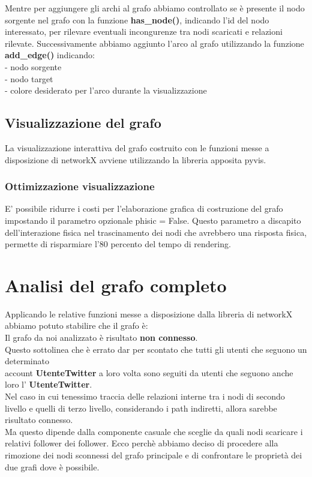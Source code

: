 \documentclass[a4paper,11pt]{report}
\begin{document}
Mentre per aggiungere gli archi al grafo abbiamo controllato se è presente il nodo sorgente nel grafo con la funzione \textbf{has\_node()}, indicando l'id del nodo interessato, per rilevare eventuali incongurenze tra nodi scaricati e relazioni rilevate. Successivamente abbiamo aggiunto l'arco al grafo utilizzando la funzione \textbf{add\_edge()} indicando:\\
- nodo sorgente\\
- nodo target \\
- colore desiderato per l'arco durante la visualizzazione\\

\subsection{Visualizzazione del grafo}
La visualizzazione interattiva del grafo costruito con le funzioni messe a disposizione di networkX avviene utilizzando la libreria apposita pyvis. 
\subsubsection{Ottimizzazione visualizzazione}
E' possibile ridurre i costi per l'elaborazione grafica di costruzione del grafo impostando il parametro opzionale phisic = False. Questo parametro a discapito dell'interazione fisica nel trascinamento  dei nodi che avrebbero una risposta fisica, permette di risparmiare l'80 percento del tempo di rendering.

\section{Analisi del grafo completo}
Applicando le relative funzioni messe a disposizione dalla libreria di networkX abbiamo potuto stabilire che il grafo è:\\
Il grafo da noi analizzato è risultato \textbf{non connesso}.\\
Questo sottolinea che è errato dar per scontato che tutti gli utenti che seguono un determinato \\account \textbf{UtenteTwitter} a loro volta sono seguiti da utenti che seguono anche loro l' \textbf{UtenteTwitter}. \newline \\Nel caso in cui tenessimo traccia delle relazioni interne tra i nodi di secondo livello e quelli di terzo livello, considerando i path indiretti, allora sarebbe risultato connesso.\\ Ma questo dipende dalla componente casuale che sceglie da quali nodi scaricare i relativi follower dei follower.\newline
Ecco perchè abbiamo deciso di procedere alla rimozione dei nodi sconnessi del grafo principale e di confrontare le proprietà dei due grafi dove è possibile.
\end{document}
